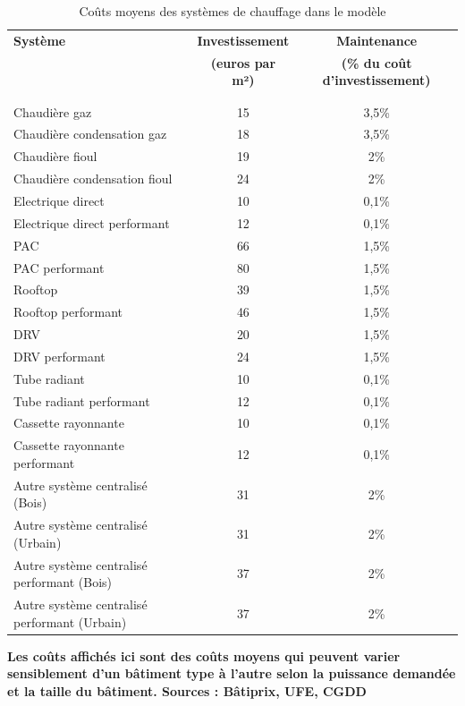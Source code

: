 \documentclass[10.5pt,a4paper]{article}
\begin{document}
{\begin{table}[h!]
\scriptsize
\caption{Coûts moyens des systèmes de chauffage dans le modèle}
\label{Coutsyst}
\begin{center}
\begin{tabular}{l|c|c}
\textbf{Système}	&	\textbf{Investissement } & \textbf{Maintenance } \\
									& \textbf{(euros par m²)} & \textbf{(\% du coût d'investissement)} \\
\\	\hline	\\	
Chaudière gaz	& 15 & 3,5\%\\	
Chaudière condensation gaz	& 18  & 3,5\%\\	
Chaudière fioul & 19  & 2\%\\	
Chaudière condensation fioul	& 24  & 2\%\\	
Electrique direct	& 10  & 0,1\%\\	
Electrique direct performant	& 12 & 0,1\% \\	
PAC	& 66 & 1,5\% \\	
PAC performant	&  80 & 1,5\%  \\	
Rooftop	& 39  &  1,5\% \\	
Rooftop performant	& 46 &  1,5\%  \\	
DRV	& 20 &  1,5\% \\	
DRV performant	& 24 &  1,5\% \\	
Tube radiant	& 10 & 0,1\%\\	
Tube radiant performant	& 12 & 0,1\%\\	
Cassette rayonnante	& 10& 0,1\% \\	
Cassette rayonnante performant	& 12 & 0,1\% \\	
Autre système centralisé (Bois)	& 31 & 2\% \\	
Autre système centralisé (Urbain) & 31  & 2\%\\	
Autre système centralisé performant (Bois)	& 37  & 2\%\\	
Autre système centralisé performant (Urbain)	& 37  & 2\%\\	
\hline	
\end{tabular}
\end{center}
\footnotesize{\textbf{ Les coûts affichés ici sont des coûts moyens qui peuvent varier sensiblement d'un bâtiment type à l'autre selon la puissance demandée et la taille du bâtiment. Sources : Bâtiprix, UFE, CGDD}}
\end{table}


}
\end{document}
